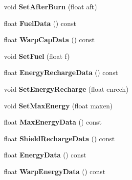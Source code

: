 \begin{DoxyCompactItemize}
\item 
void {\bfseries Set\+After\+Burn} (float aft)\hypertarget{classUnit_a5428463506290f502d6f4b5955489d5c}{}\label{classUnit_a5428463506290f502d6f4b5955489d5c}

\item 
float {\bfseries Fuel\+Data} () const \hypertarget{classUnit_ad0d6be31de414e9aed1a4a2ee18aaf3a}{}\label{classUnit_ad0d6be31de414e9aed1a4a2ee18aaf3a}

\item 
float {\bfseries Warp\+Cap\+Data} () const \hypertarget{classUnit_a07b0fe4672fb2d9d3cc9d48f4b7def7f}{}\label{classUnit_a07b0fe4672fb2d9d3cc9d48f4b7def7f}

\item 
void {\bfseries Set\+Fuel} (float f)\hypertarget{classUnit_aa8b13fb4b0a7a28d5d68e361b2ddeee2}{}\label{classUnit_aa8b13fb4b0a7a28d5d68e361b2ddeee2}

\item 
float {\bfseries Energy\+Recharge\+Data} () const \hypertarget{classUnit_a59b1a3b732fafcd6c8cbf5234099bf38}{}\label{classUnit_a59b1a3b732fafcd6c8cbf5234099bf38}

\item 
void {\bfseries Set\+Energy\+Recharge} (float enrech)\hypertarget{classUnit_a9196c2f6f435a9ec1d825f6e4f0adb16}{}\label{classUnit_a9196c2f6f435a9ec1d825f6e4f0adb16}

\item 
void {\bfseries Set\+Max\+Energy} (float maxen)\hypertarget{classUnit_a90c92d57b527e7311691e89dd78bff47}{}\label{classUnit_a90c92d57b527e7311691e89dd78bff47}

\item 
float {\bfseries Max\+Energy\+Data} () const \hypertarget{classUnit_abadd834f072133e592655cdeec88d323}{}\label{classUnit_abadd834f072133e592655cdeec88d323}

\item 
float {\bfseries Shield\+Recharge\+Data} () const \hypertarget{classUnit_a6bf58f4e898d9d634c9d007ef1581b2b}{}\label{classUnit_a6bf58f4e898d9d634c9d007ef1581b2b}

\item 
float {\bfseries Energy\+Data} () const \hypertarget{classUnit_a8cf1e92756859f243fa5fe396a0e6653}{}\label{classUnit_a8cf1e92756859f243fa5fe396a0e6653}

\item 
float {\bfseries Warp\+Energy\+Data} () const \hypertarget{classUnit_afcfd2dd588a5d482fbbbc72a7d59726f}{}\label{classUnit_afcfd2dd588a5d482fbbbc72a7d59726f}


\end{DoxyCompactItemize}
